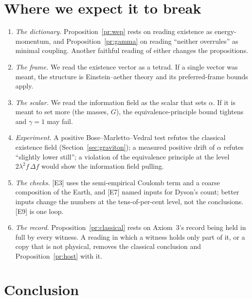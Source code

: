 \documentclass[11pt,a4paper]{article}
\theoremstyle{definition}
\theoremstyle{remark}
\newcommand{\chk}[1]{\textsf{[#1]}}
\begin{document}
\section{Where we expect it to break}\label{sec:break}
\begin{enumerate}[nosep]
\item \emph{The dictionary.} Proposition~\ref{pr:wep} rests on reading existence as energy-momentum, and Proposition~\ref{pr:gamma} on
reading ``neither overrules'' as minimal coupling. Another faithful reading of either changes the propositions.
\item \emph{The frame.} We read the existence vector as a tetrad. If a single vector was meant, the structure is Einstein--aether theory
and its preferred-frame bounds apply.
\item \emph{The scalar.} We read the information field as the scalar that sets $\alpha$. If it is meant to set more (the masses, $G$), the
equivalence-principle bound tightens and $\gamma=1$ may fail.
\item \emph{Experiment.} A positive Bose--Marletto--Vedral test refutes the classical existence field (Section~\ref{sec:graviton});
a measured positive drift of $\alpha$ refutes ``slightly lower still''; a violation of the equivalence principle at the level
$2\lambda^2f\,\Delta f$ would show the information field pulling.
\item \emph{The checks.} \chk{E3} uses the semi-empirical Coulomb term and a coarse composition of the Earth, and \chk{E7} named inputs
for Dyson's count; better inputs change the numbers at the tens-of-per-cent level, not the conclusions. \chk{E9} is one loop.
\item \emph{The record.} Proposition~\ref{pr:classical} rests on Axiom~3's record being held in full by every witness. A reading in which
a witness holds only part of it, or a copy that is not physical, removes the classical conclusion and Proposition~\ref{pr:host} with it.
\end{enumerate}

\section{Conclusion}
\end{document}
